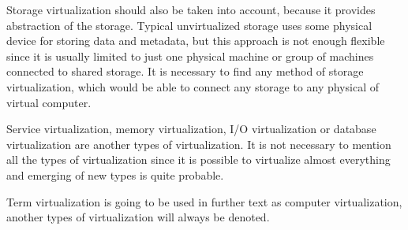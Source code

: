 Storage virtualization should also be taken into account, because it provides abstraction of the storage. Typical unvirtualized storage uses some physical device for storing data and metadata, but this approach is not enough flexible since it is usually limited to just one physical machine or group of machines connected to shared storage. It is necessary to find any method of storage virtualization, which would be able to connect any storage to any physical of virtual computer.

Service virtualization, memory virtualization, I/O virtualization or database virtualization are another types of virtualization. It is not necessary to mention all the types of virtualization since it is possible to virtualize almost everything and emerging of new types is quite probable. 

Term virtualization is going to be used in further text as computer virtualization, another types of virtualization will always be denoted.
